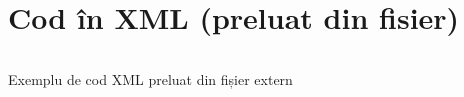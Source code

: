 \newpage
\section{Cod în XML (preluat din fisier)}
\label{anexa8:listing_xml}

\begin{code}
    \inputminted{xml}{anexe/coduri_sursa/pom.xml}
    \caption{Exemplu de cod XML preluat din fișier extern}
    \label{code:xml_pom}
\end{code}
\fi


